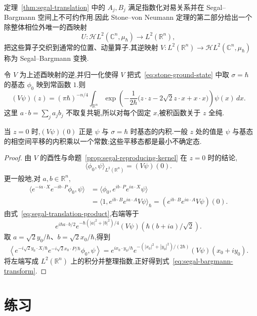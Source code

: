{定理~\ref{thm:segal-translation} 中的 $A_j,B_j$ 满足指数化对易关系并在 Segal--Bargmann 空间上不可约作用.因此 Stone--von Neumann 定理的第二部分给出一个除整体相位外唯一的酉映射
\[
U:\mathcal H L^2(\mathbb C^n,\mu_\hbar)\to L^2(\mathbb R^n),
\]
把这些算子交织到通常的位置、动量算子.其逆映射 $V:L^2(\mathbb R^n)\to\mathcal H L^2(\mathbb C^n,\mu_\hbar)$ 称为 Segal--Bargmann 变换.

\begin{theorem}\label{thm:segal-bargmann-transform}
令 $V$ 为上述酉映射的逆,并归一化使得 $V$ 把式~\eqref{eq:stone-ground-state} 中取 $\sigma=\hbar$ 的基态 $\phi_0$ 映到常函数 $1$.则
\[
(V\psi)(z)=(\pi\hbar)^{-n/4}\int_{\mathbb R^n}
\exp\left(-\frac1{2\hbar}\bigl(z\cdot z-2\sqrt2z\cdot x+x\cdot x\bigr)\right)\psi(x)\,dx.
\label{eq:segal-bargmann-transform}
\]
这里 $a\cdot b=\sum_ja_jb_j$ 不取复共轭,所以对每个固定 $x$,被积函数关于 $z$ 全纯.
\end{theorem}

当 $z=0$ 时,$(V\psi)(0)$ 正是 $\psi$ 与 $\sigma=\hbar$ 时基态的内积.一般 $z$ 处的值是 $\psi$ 与基态的相空间平移的内积乘以一个常数;这些平移态都是最小不确定态.

\begin{proof}
由 $V$ 的酉性与命题~\ref{prop:segal-reproducing-kernel} 在 $z=0$ 时的结论,
\[
\langle\phi_0,\psi\rangle_{L^2(\mathbb R^n)}=(V\psi)(0).
\]
更一般地,对 $a,b\in\mathbb R^n$,
\[
\begin{aligned}
\langle e^{-ia\cdot X}e^{-ib\cdot P}\phi_0,\psi\rangle
&=\langle\phi_0,e^{ib\cdot P}e^{ia\cdot X}\psi\rangle\\
&=\langle1,e^{ib\cdot B}e^{ia\cdot A}V\psi\rangle_\hbar
=(e^{ib\cdot B}e^{ia\cdot A}V\psi)(0).
\end{aligned}
\label{eq:segal-transform-intermediate}
\]
由式~\eqref{eq:segal-translation-product},右端等于
\[
e^{i\hbar a\cdot b/2}e^{-\hbar(|a|^2+|b|^2)/4}(V\psi)(\hbar(b+ia)/\sqrt2).
\]
取 $a=\sqrt2y_0/\hbar$、$b=\sqrt2x_0/\hbar$,得到
\[
\left\langle e^{-i\sqrt2y_0\cdot X/\hbar}e^{-i\sqrt2x_0\cdot P/\hbar}\phi_0,\psi\right\rangle
=e^{ix_0\cdot y_0/\hbar}e^{-(|x_0|^2+|y_0|^2)/(2\hbar)}
(V\psi)(x_0+iy_0).
\]
将左端写成 $L^2(\mathbb R^n)$ 上的积分并整理指数,正好得到式~\eqref{eq:segal-bargmann-transform}.
\end{proof}

\section{练习}
\label{sec:chapter14-exercises}

}
